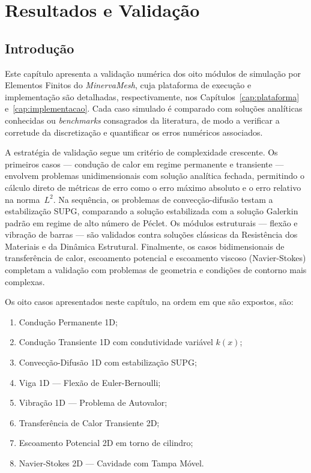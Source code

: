 \chapter{Resultados e Validação}
\label{cap5}


\section{Introdução}
\label{sec:resultados_intro}

Este capítulo apresenta a validação numérica dos oito módulos de simulação por Elementos Finitos do \textit{MinervaMesh}, cuja plataforma de execução e implementação são detalhadas, respectivamente, nos Capítulos~\ref{cap:plataforma} e~\ref{cap:implementacao}. Cada caso simulado é comparado com soluções analíticas conhecidas ou \textit{benchmarks} consagrados da literatura, de modo a verificar a corretude da discretização e quantificar os erros numéricos associados.

A estratégia de validação segue um critério de complexidade crescente. Os primeiros casos — condução de calor em regime permanente e transiente — envolvem problemas unidimensionais com solução analítica fechada, permitindo o cálculo direto de métricas de erro como o erro máximo absoluto e o erro relativo na norma~$L^2$. Na sequência, os problemas de convecção-difusão testam a estabilização SUPG, comparando a solução estabilizada com a solução Galerkin padrão em regime de alto número de Péclet. Os módulos estruturais — flexão e vibração de barras — são validados contra soluções clássicas da Resistência dos Materiais e da Dinâmica Estrutural. Finalmente, os casos bidimensionais de transferência de calor, escoamento potencial e escoamento viscoso (Navier-Stokes) completam a validação com problemas de geometria e condições de contorno mais complexas.

Os oito casos apresentados neste capítulo, na ordem em que são expostos, são:

\begin{enumerate}
    \item Condução Permanente 1D;
    \item Condução Transiente 1D com condutividade variável $k(x)$;
    \item Convecção-Difusão 1D com estabilização SUPG;
    \item Viga 1D --- Flexão de Euler-Bernoulli;
    \item Vibração 1D --- Problema de Autovalor;
    \item Transferência de Calor Transiente 2D;
    \item Escoamento Potencial 2D em torno de cilindro;
    \item Navier-Stokes 2D --- Cavidade com Tampa Móvel.
\end{enumerate}

